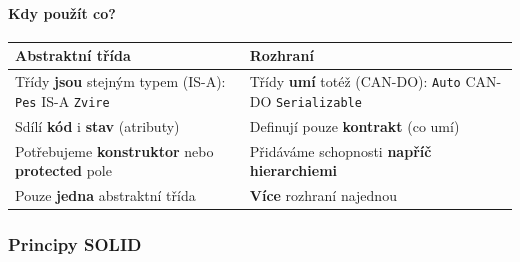 \paragraph{Kdy použít co?}

\begin{center}
\begin{tabular}{p{5.5cm}p{5.5cm}}
\toprule
\textbf{Abstraktní třída} & \textbf{Rozhraní} \\
\midrule
Třídy \textbf{jsou} stejným typem (IS-A): \newline
\texttt{Pes} IS-A \texttt{Zvire} &
Třídy \textbf{umí} totéž (CAN-DO): \newline
\texttt{Auto} CAN-DO \texttt{Serializable} \\
\midrule
Sdílí \textbf{kód} i \textbf{stav} (atributy) &
Definují pouze \textbf{kontrakt} (co umí) \\
\midrule
Potřebujeme \textbf{konstruktor} nebo \textbf{protected} pole &
Přidáváme schopnosti \textbf{napříč hierarchiemi} \\
\midrule
Pouze \textbf{jedna} abstraktní třída &
\textbf{Více} rozhraní najednou \\
\bottomrule
\end{tabular}
\end{center}

\subsubsection{Principy SOLID}

